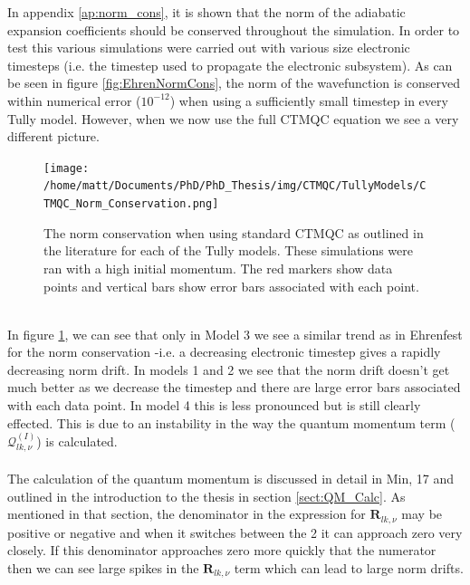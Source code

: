 \noindent In appendix \ref{ap:norm_cons}, it is shown that the norm of the adiabatic expansion coefficients should be conserved throughout the simulation. In order to test this various simulations were carried out with various size electronic timesteps (i.e. the timestep used to propagate the electronic subsystem). As can be seen in figure \ref{fig:EhrenNormCons}, the norm of the wavefunction is conserved within numerical error ($10^{-12}$) when using a sufficiently small timestep in every Tully model. However, when we now use the full CTMQC equation we see a very different picture.
\begin{figure}[h]
	\texttt{[image: /home/matt/Documents/PhD/PhD\_Thesis/img/CTMQC/TullyModels/CTMQC\_Norm\_Conservation.png]}
	\caption{\label{fig:CTMQCNormCons}The norm conservation when using standard CTMQC as outlined in the literature for each of the Tully models. These simulations were ran with a high initial momentum. The red markers show data points and vertical bars show error bars associated with each point.}
\end{figure}
\\
In figure \ref{fig:CTMQCNormCons}, we can see that only in Model 3 we see a similar trend as in Ehrenfest for the norm conservation -i.e. a decreasing electronic timestep gives a rapidly decreasing norm drift. In models 1 and 2 we see that the norm drift doesn't get much better as we decrease the timestep and there are large error bars associated with each data point. In model 4 this is less pronounced but is still clearly effected. This is due to an instability in the way the quantum momentum term ($\mathcal{Q}_{lk, \nu}^{(I)}$) is calculated.
\\\\
The calculation of the quantum momentum is discussed in detail in Min, 17 \cite{min_ab_2017} and outlined in the introduction to the thesis in section \ref{sect:QM_Calc}. As mentioned in that section, the denominator in the expression for $\mathbf{R}_{lk, \nu}$ may be positive or negative and when it switches between the 2 it can approach zero very closely. If this denominator approaches zero more quickly that the numerator then we can see large spikes in the $\mathbf{R}_{lk, \nu}$ term which can lead to large norm drifts.


